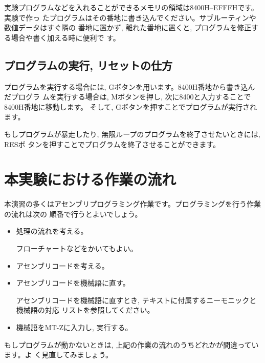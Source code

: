 実験プログラムなどを入れることができるメモリの領域は8400H--EFFFHです。実験で作っ
たプログラムはその番地に書き込んでください。サブルーティンや数値データはすぐ隣の
番地に置かず, 離れた番地に置くと, プログラムを修正する場合や書く加える時に便利で
す。

\subsection{プログラムの実行, リセットの仕方}

プログラムを実行する場合には, Gボタンを用います。8400H番地から書き込んだプログラ
ムを実行する場合は, Mボタンを押し, 次に8400と入力することで8400H番地に移動します。
そして, Gボタンを押すことでプログラムが実行されます。

もしプログラムが暴走したり, 無限ループのプログラムを終了させたいときには, RESボ
タンを押すことでプログラムを終了させることができます。

\section{本実験における作業の流れ}

本演習の多くはアセンブリプログラミング作業です。プログラミングを行う作業の流れは次の
順番で行うとよいでしょう。

\begin{itemize}
\item 処理の流れを考える。

      フローチャートなどをかいてもよい。

\item アセンブリコードを考える。

\item アセンブリコードを機械語に直す。

アセンブリコードを機械語に直すとき, テキストに付属するニーモニックと機械語の対応
      リストを参照してください。

\item 機械語をMT-Zに入力し, 実行する。
\end{itemize}

もしプログラムが動かないときは, 上記の作業の流れのうちどれかが間違っています。よ
く見直してみましょう。
